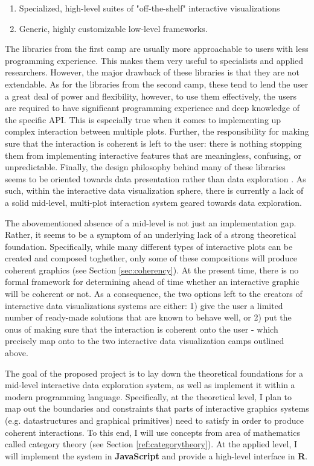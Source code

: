 \documentclass[12pt,a4paper]{article}
\begin{document}
\begin{enumerate}

\item Specialized, high-level suites of "off-the-shelf" interactive visualizations
\item Generic, highly customizable low-level frameworks.

\end{enumerate}

The libraries from the first camp are usually more approachable to users with less programming experience. This makes them very useful to specialists and applied researchers. However, the major drawback of these libraries is that they are not extendable. As for the libraries from the second camp, these tend to lend the user a great deal of power and flexibility, however, to use them effectively, the users are required to have significant programming experience and deep knowledge of the specific API. This is especially true when it comes to implementing up complex interaction between multiple plots. Further, the responsibility for making sure that the interaction is coherent is left to the user: there is nothing stopping them from implementing interactive features that are meaningless, confusing, or unpredictable. Finally, the design philosophy behind many of these libraries seems to be oriented towards data presentation rather than data exploration \citep{batch2017}. As such, within the interactive data visualization sphere, there is currently a lack of a solid mid-level, multi-plot interaction system geared towards data exploration.

The abovementioned absence of a mid-level is not just an implementation gap. Rather, it seems to be a symptom of an underlying lack of a strong theoretical foundation. Specifically, while many different types of interactive plots can be created and composed toghether, only some of these compositions will produce coherent graphics (see Section \ref{sec:coherency}). At the present time, there is no formal framework for determining ahead of time whether an interactive graphic will be coherent or not. As a consequence, the two options left to the creators of interactive data visualizations systems are either: 1) give the user a limited number of ready-made solutions that are known to behave well, or 2) put the onus of making sure that the interaction is coherent onto the user - which precisely map onto to the two interactive data visualization camps outlined above. 

The goal of the proposed project is to lay down the theoretical foundations for a mid-level interactive data exploration system, as well as implement it within a modern programming language. Specifically, at the theoretical level, I plan to map out the boundaries and constraints that parts of interactive graphics systems (e.g. datastructures and graphical primitives) need to satisfy in order to produce coherent interactions. To this end, I will use concepts from area of mathematics called category theory (see Section \ref{ref:categorytheory}). At the applied level, I will implement the system in \textbf{JavaScript} and provide a high-level interface in \textbf{R}.  
\end{document}
